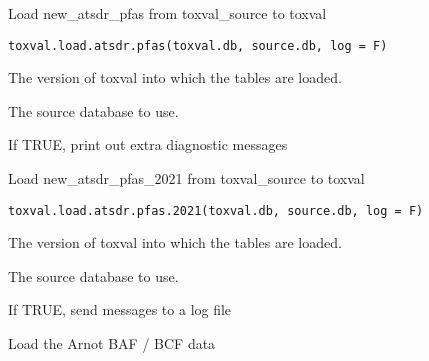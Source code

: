 \documentclass[letterpaper]{book}
\begin{document}
%
\begin{Description}\relax
Load new\_atsdr\_pfas from toxval\_source to toxval
\end{Description}
%
\begin{Usage}
\begin{verbatim}
toxval.load.atsdr.pfas(toxval.db, source.db, log = F)
\end{verbatim}
\end{Usage}
%
\begin{Arguments}
\begin{ldescription}
\item[\code{toxval.db}] The version of toxval into which the tables are loaded.

\item[\code{source.db}] The source database to use.

\item[\code{verbose}] If TRUE, print out extra diagnostic messages
\end{ldescription}
\end{Arguments}
%
\begin{Description}\relax
Load new\_atsdr\_pfas\_2021 from toxval\_source to toxval
\end{Description}
%
\begin{Usage}
\begin{verbatim}
toxval.load.atsdr.pfas.2021(toxval.db, source.db, log = F)
\end{verbatim}
\end{Usage}
%
\begin{Arguments}
\begin{ldescription}
\item[\code{toxval.db}] The version of toxval into which the tables are loaded.

\item[\code{source.db}] The source database to use.

\item[\code{log}] If TRUE, send messages to a log file
\end{ldescription}
\end{Arguments}
%
\begin{Description}\relax
Load the Arnot BAF / BCF data
\end{Description}
\end{document}
